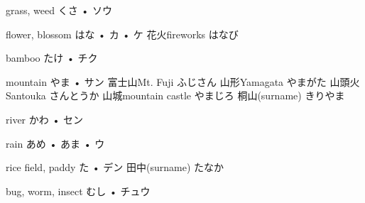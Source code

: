 



\setcounter{cardnum}{33}

		{grass, weed}
		{くさ • ソウ}
		{}{}
		{}{}
		{}{}
		{}{}
		{}{}

		{flower, blossom}
		{はな • カ • ケ}
		{花火}{fireworks はなび}
		{}{}
		{}{}
		{}{}
		{}{}

		{bamboo}
		{たけ • チク}
		{}{}
		{}{}
		{}{}
		{}{}
		{}{}

		{mountain}
		{やま • サン}
		{富士山}{Mt. Fuji ふじさん}
		{山形}{Yamagata やまがた}
		{山頭火}{Santouka さんとうか}
		{山城}{mountain castle やまじろ}
		{桐山}{(surname) きりやま}

		{river}
		{かわ • セン}
		{}{}
		{}{}
		{}{}
		{}{}
		{}{}

		{rain}
		{あめ • あま • ウ}
		{}{}
		{}{}
		{}{}
		{}{}
		{}{}

		{rice field, paddy}
		{た • デン}
		{田中}{(surname) たなか}
		{}{}
		{}{}
		{}{}
		{}{}

		{bug, worm, insect}
		{むし • チュウ}
		{}{}
		{}{}
		{}{}
		{}{}
		{}{}

